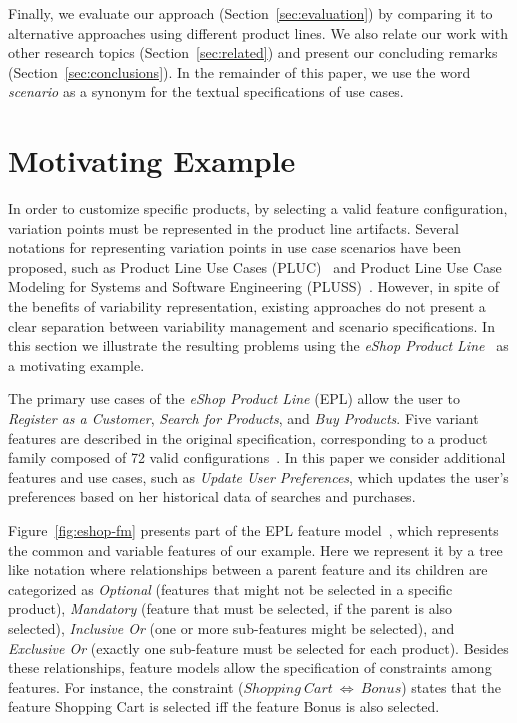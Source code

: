 \documentclass{sig-alt-full}
\begin{document}
Finally, we evaluate our approach (Section~\ref{sec:evaluation}) by comparing it
to alternative approaches using different product lines. We also relate our work
with other research topics (Section~\ref{sec:related}) and present our concluding
remarks (Section~\ref{sec:conclusions}). In the remainder of this paper, we use the word
\emph{scenario} as a synonym for the textual specifications of use
cases.
\section{Motivating Example}
\label{sec:problem}

In order to customize specific products, by selecting a valid feature
configuration, variation points must be represented in the product line
artifacts. Several notations for representing variation points in use case
scenarios have been proposed, such as Product Line Use Cases
(PLUC)~\cite{Bertolino:2003aa} and Product Line Use Case Modeling for Systems
and Software Engineering (PLUSS)~\cite{Eriksson:2005aa}. However, in spite of
the benefits of variability representation, existing approaches do not present
a clear separation between variability management and scenario specifications. In this
section we illustrate the resulting problems using the \emph{eShop Product
Line}~\cite{Pohl:eshop} as a motivating example.

The primary use cases of the \emph{eShop Product Line} (EPL) allow the user to
\emph{Register as a Customer}, \emph{Search for Products}, and \emph{Buy
Products}.  Five variant features are described in the original specification,
corresponding to a product family composed of 72 valid
configurations~\cite{Pohl:eshop}. In this paper we consider additional features
and use cases, such as \emph{Update User Preferences}, which updates the user's
preferences based on her historical data of searches and purchases.

Figure~\ref{fig:eshop-fm} presents part of the
EPL feature model~\cite{Gheyi:2006aa,Czarnecki:2000aa}, which represents the
common and variable features of our example. Here we represent it by a tree like
notation where relationships between a parent feature and its children are
categorized as \emph{Optional} (features that might not be selected in a specific product), \emph{Mandatory} (feature that must be selected, if the parent
is also selected), \emph{Inclusive Or} (one or more sub-features might be selected), and
\emph{Exclusive Or} (exactly one sub-feature must be selected for each product).
Besides these relationships, feature models allow the specification of
constraints among features. For instance, the constraint ($Shopping\ Cart\
\Leftrightarrow\ Bonus$) states that the feature Shopping Cart is selected iff
the feature Bonus is also selected.
\end{document}
